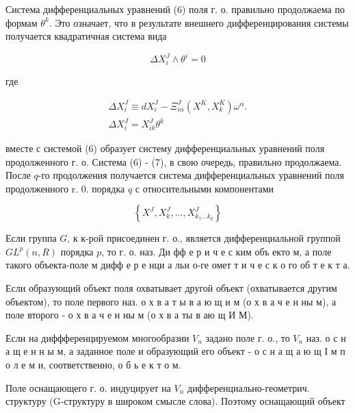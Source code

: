 \documentclass[10pt]{article}
\begin{document}
Система дифференциальных уравнений (6) поля г. о. правильно продолжаема по формам $\theta^{k}$. Это означает, что в результате внешнего дифференцирования системы получается квадратичная система вида



\[

\Delta X_{i}^{J} \wedge \theta^{i}=0

\]



где



\[

\begin{gathered}

\Delta X_{i}^{J} \equiv d X_{i}^{J}-\Xi_{i \alpha}^{J}\left(X^{K}, X_{k}^{K}\right) \omega^{\alpha} . \\

\Delta X_{i}^{J}=X_{i k}^{J} \theta^{k}

\end{gathered}

\]



вместе с системой (6) образует систему дифференциальных уравнений поля продолженного г. о. Система (6) - (7), в свою очередь, правильно продолжаема. После $q$-го продолжения получается система дифференциальных уравнений поля продолженного r. 0. порядка $q$ с относительными компонентами



\[

\left\{X^{J}, X_{k}^{J}, \ldots, X_{k_{1} \ldots k_{q}}^{J}\right\}

\]



Если группа $G$, к к-рой присоединен г. о., является дифференциальной группой $G L^{p}(n, R)$ порядка $p$, то г. о. наз. Ди фф е р и ч е с ким объ екто м, а поле такого объекта-поле м дифф е р е нци а льн о-ге омет т и ч е с к о го об т е к т а.



Если образующий объект поля охватывает другой объект (охватывается другим объектом), то поле первого наз. о х в а т ы в а ю щ и м (о х в а ч е н ны м), а поле второго - о х в а ч е н ны м (о х в а ты в аю щ И М).



Если на диффференцируемом многообразии $V_{n}$ задано поле г. о., то $V_{n}$ наз. о с н а щ е н н ы м, а заданное поле и образующий его объект - о с н а щ а ю щ І м п о л е м и, соответственно, о б ь е к т о м.



Поле оснащающего г. о. индуцирует на $V_{n}$ дифференциально-геометрич. структуру (G-структуру в широком смысле слова). Поэтому оснащающий объект
\end{document}
